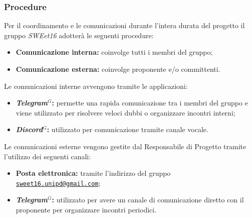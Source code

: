         \subsubsection{Procedure}


            Per il coordinamento e le comunicazioni durante l'intera durata del progetto il gruppo \textit{SWEet16} adotterà le seguenti procedure:
            \begin{itemize}
                \item \textbf{Comunicazione interna:} coinvolge tutti i membri del gruppo;
                \item \textbf{Comunicazione esterna:} coinvolge proponente e/o committenti.
            \end{itemize}


            Le comunicazioni interne avvengono tramite le applicazioni:
            \begin{itemize}
                \item \textbf{\emph{Telegram}$^{G}$:} permette una rapida comunicazione tra i membri del gruppo e viene utilizzato per risolvere veloci dubbi o organizzare incontri interni;
                \item \textbf{\emph{Discord}$^{G}$:} utilizzato per comunicazione tramite canale vocale.
            \end{itemize}


            Le comunicazioni esterne vengono gestite dal Responsabile di Progetto tramite l'utilizzo dei seguenti canali:
            \begin{itemize}
                \item \textbf{Posta elettronica:} tramite l'indirizzo del gruppo \href{mailto:sweet16.unipd@gmail.com}{\nolinkurl{sweet16.unipd@gmail.com}};
                \item \textbf{\emph{Telegram}$^{G}$:} utilizzato per avere un canale di comunicazione diretto con il proponente per organizzare incontri periodici.
            \end{itemize}



